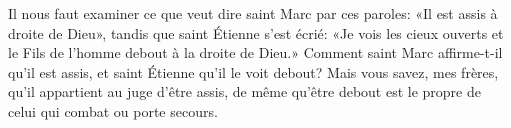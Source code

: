 Il nous faut examiner ce que veut dire saint Marc par ces paroles:
	«Il est assis à droite de Dieu»,
	tandis que saint Étienne s’est écrié:
	«Je vois les cieux ouverts
		et le Fils de l’homme debout à la droite de Dieu.»
Comment saint Marc affirme-t-il qu’il est assis,
	et saint Étienne qu’il le voit debout?
Mais vous savez, mes frères, qu’il appartient au juge d’être assis,
	de même qu’être debout est le propre de celui qui combat ou porte secours.
